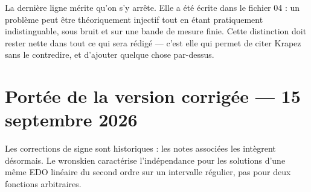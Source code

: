 \documentclass[11pt,a4paper]{article}
\begin{document}
\medskip
La dernière ligne mérite qu'on s'y arrête. Elle a été écrite dans le fichier 04 : un problème peut être
théoriquement injectif tout en étant pratiquement indistinguable, sous bruit et sur une bande de mesure
finie. Cette distinction doit rester nette dans tout ce qui sera rédigé --- c'est elle qui permet de
citer Krapez sans le contredire, et d'ajouter quelque chose par-dessus.

\section*{Portée de la version corrigée --- 15 septembre 2026}
Les corrections de signe sont historiques : les notes associées les intègrent désormais. Le wronskien caractérise l'indépendance pour les solutions d'une même EDO linéaire du second ordre sur un intervalle régulier, pas pour deux fonctions arbitraires.
\end{document}
